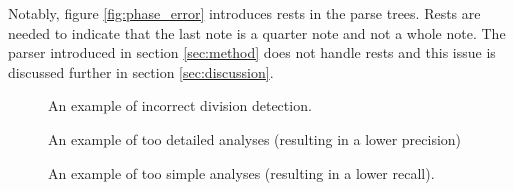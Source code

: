 Notably, figure \ref{fig:phase_error} introduces rests in the parse trees. Rests are needed to indicate that the last note is a quarter note and not a whole note. The parser introduced in section \ref{sec:method} does not handle rests and this issue is discussed further in section \ref{sec:discussion}.
\begin{figure}
\centering
{}
\caption{An example of incorrect division detection.}
\label{fig:div_error}
\end{figure}


\begin{figure}
\centering
{}
\caption{An example of too detailed analyses (resulting in a lower precision)}
\label{fig:precision_error}
\end{figure}

\begin{figure}
\centering
\caption{An example of too simple analyses (resulting in a lower recall).}
\label{fig:recall_error}
\end{figure}



